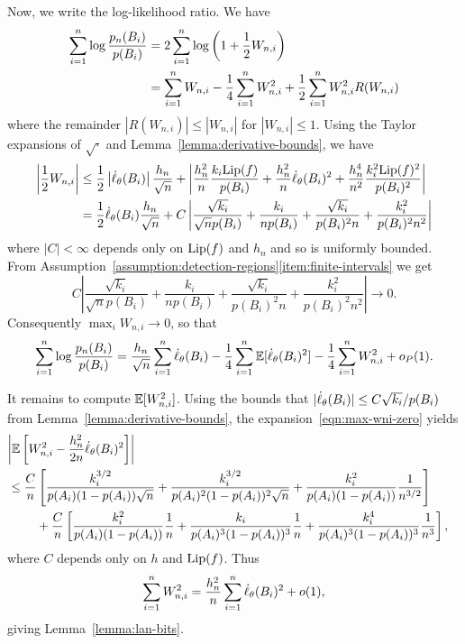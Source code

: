 Now, we write the log-likelihood ratio. We have
\begin{align*}
  \sum_{i = 1}^n \log \frac{p_n(B_i)}{p(B_i)}
  & = 2 \sum_{i = 1}^n \log\left(1 + \frac{1}{2} W_{n,i}\right) \\
  & = \sum_{i = 1}^n W_{n,i}
  - \frac{1}{4} \sum_{i = 1}^n W_{n,i}^2
  + \frac{1}{2} \sum_{i = 1}^n W_{n,i}^2 R(W_{n,i})
\end{align*}
where the remainder $|R(W_{n,i})| \le |W_{n,i}|$ for $|W_{n,i}| \le 1$.
Using the Taylor expansions of $\sqrt{\cdot}$ and
Lemma~\ref{lemma:derivative-bounds}, we have
\begin{align}
  \nonumber
  \left| \frac{1}{2} W_{n,i} \right|
  & \leq \frac{1}{2} \left| \dot{\ell}_\theta(B_i) \right|
  \frac{h_n}{\sqrt{n}}
  + \left|\frac{h_n^2}{n} \frac{k_i {\rm \textup{Lip}}(f)}{p(B_i)}
  + \frac{h_n^2}{n} \dot{\ell}_\theta(B_i)^2
  + \frac{ h_n^4}{n^2} \frac{k_i^2 {\rm \textup{Lip}}(f)^2}{p(B_i)^2}\right| \\
  & = \frac{1}{2} \dot{\ell}_\theta(B_i)
  \frac{h_n}{\sqrt{n}} +
  C \left|\frac{\sqrt{k_i}}{\sqrt{n} p(B_i)}
  + \frac{k_i}{n p(B_i)}
  + \frac{\sqrt{k_i}}{p(B_i)^2 n}
  + \frac{k_i^2}{p(B_i)^2 n^2}
  \right|
  \label{eqn:max-wni-zero}
\end{align}
where $|C| < \infty$ depends only on ${\rm \textup{Lip}}(f)$ and $h_n$ and so is
uniformly bounded. From Assumption~\ref{assumption:detection-regions}\eqref{item:finite-intervals} we get
\[
C \left|\frac{\sqrt{k_i}}{\sqrt{n} p(B_i)}
  + \frac{k_i}{n p(B_i)}
  + \frac{\sqrt{k_i}}{p(B_i)^2 n}
  + \frac{k_i^2}{p(B_i)^2 n^2}
  \right| \to 0. 
\]
Consequently $\max_i W_{n,i} \to 0$, so that
\begin{equation}
  \label{eqn:almost-at-the-end}
  \sum_{i = 1}^n \log \frac{p_n(B_i)}{p(B_i)}
  = \frac{h_n}{\sqrt{n}} \sum_{i = 1}^n \dot{\ell}_\theta(B_i)
  - \frac{1}{4} \sum_{i = 1}^n \mathbb{E}[\dot{\ell}_\theta(B_i)^2]
  - \frac{1}{4} \sum_{i = 1}^n W_{n,i}^2 + o_P(1).
\end{equation}

It remains to compute $\mathbb{E}[W_{n,i}^2]$. Using the bounds
that $|\dot{\ell}_\theta(B_i)| \le C \sqrt{k_i} / p(B_i)$ from
Lemma~\ref{lemma:derivative-bounds},
the
expansion~\eqref{eqn:max-wni-zero}
yields
\begin{align*}
  \lefteqn{\left|\E\left[W_{n,i}^2 - \frac{h_n^2}{2n} \score_\theta(B_i)^2\right]
    \right|} \\
  &
  \le \frac{C}{n} \left[
    \frac{k_i^{3/2}}{p(A_i)(1 - p(A_i)) \sqrt{n}}
    + \frac{k_i^{3/2}}{p(A_i)^2 (1 - p(A_i))^2 \sqrt{n}}
    + \frac{k_i^2}{p(A_i)(1 - p(A_i))} \frac{1}{n^{3/2}}
    \right] \\
  & \qquad ~ +
  \frac{C}{n}
  \left[\frac{k_i^2}{p(A_i)(1 - p(A_i))} \frac{1}{n}
    + \frac{k_i}{p(A_i)^3(1 - p(A_i))^3} \frac{1}{n}
    + \frac{k_i^4}{p(A_i)^3 (1 - p(A_i))^3} \frac{1}{n^3} \right],
\end{align*}
where $C$ depends only on $h$ and ${\rm \textup{Lip}}(f)$.
Thus
\begin{equation*}
  \sum_{i = 1}^n W_{n,i}^2
  = \frac{h_n^2}{n} \sum_{i = 1}^n \dot{\ell}_\theta(B_i)^2
  + o(1),
\end{equation*}
giving Lemma~\ref{lemma:lan-bits}.

